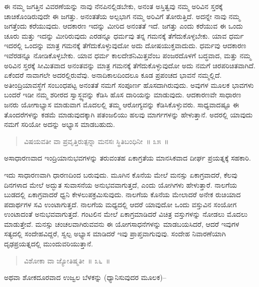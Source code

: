 ಈ ನಮ್ಮ ಜಗತ್ತಿನ ವಿವರಣೆಯನ್ನು ನಾವು ನೆನಪಿನಲ್ಲಿಡಬೇಕು, ಅನಂತ ಅಸ್ತಿತ್ವವು ನಮ್ಮ ಅರಿವಿನ ಸ್ತರಕ್ಕೆ ಚಾಚಿಕೊಂಡಿರುವುದೇ ಈ ಜಗತ್ತು. ಅನಂತತೆಯ ಅಲ್ಪಭಾಗ ನಮ್ಮ ಅರಿವಿಗೆ ತೋರುತ್ತಿದೆ. ಅದನ್ನೇ ನಾವು ನಮ್ಮ ಜಗತ್ತೆಂದು ಕರೆಯುವುದು. ಆದಕಾರಣ ಇದನ್ನು ಮೀರಿದ ಅನಂತತೆ ಇದೆ. ಜಗತ್ತು ಎಂದು ಕರೆಯುವ ಈ ಒಂದು ಚೂರು ಮತ್ತು ಇದನ್ನು ಮೀರಿರುವುದು ಎರಡನ್ನೂ ಧರ್ಮವು ತನ್ನ ಗಮನಕ್ಕೆ ತೆಗೆದುಕೊಳ್ಳಬೇಕು. ಯಾವ ಧರ್ಮ ಇದರಲ್ಲಿ ಒಂದನ್ನು ಮಾತ್ರ ಗಮನಕ್ಕೆ ತೆಗೆದುಕೊಳ್ಳುವುದೋ ಅದು ದೋಷಯುಕ್ತವಾದುದು. ಧರ್ಮವು ಆದಕಾರಣ ಇವೆರಡನ್ನೂ ನೋಡಿಕೊಳ್ಳಬೇಕು. ಯಾವ ಧರ್ಮ ಕಾಲದೇಶನಿಮಿತ್ತವೆಂಬ ಪಂಜರದೊಳಗೆ ಬದ್ಧವಾದ, ಮತ್ತು ನಮ್ಮ ಅರಿವಿನ ಸ್ತರಕ್ಕೆ ಸೀಮಿತವಾದ ಅನಂತವನ್ನು ಮಾತ್ರ ಗಮನಕ್ಕೆ ತೆಗೆದುಕೊಳ್ಳುವುದೋ ಅದು ನಮಗೆ ಚಿರಪರಿಚಿತವಾಗಿದೆ. ಏಕೆಂದರೆ ನಾವಾಗಲೇ ಅದರಲ್ಲಿರುವೆವು. ಅನಾದಿಕಾಲದಿಂದಲೂ ಕೂಡ ಪ್ರಪಂಚದ ಭಾವನೆ ನಮ್ಮಲ್ಲಿದೆ. ಅತೀಂದ್ರಿಯಾವಸ್ಥೆಗೆ ಸಂಬಂಧಪಟ್ಟ ಅನಂತತೆ ನಮಗೆ ಸಂಪೂರ್ಣ ಹೊಸದಾಗಿರುವುದು. ಅವುಗಳ ಮೂಲಕ ಭಾವಗಳು ಬಂದರೆ ಇಡೀ ನಮ್ಮ ಶರೀರದ ಸ್ವಾಸ್ಥ್ಯವನ್ನು ಕೆಡಿಸಿ ಹೊಸ ದಾರಿಯನ್ನು ಮಾಡುವುದು. ಆದಕಾರಣವೇ ಸಾಧಾರಣ ಜನರು ಯೋಗಾಭ್ಯಾಸ ಮಾಡುವಾಗ ಮೊದಲಲ್ಲಿ ತಮ್ಮ ಆರೋಗ್ಯವನ್ನು ಕೆಡಿಸಿಕೊಳ್ಳುವರು. ಸಾಧ್ಯವಾದಷ್ಟೂ ಈ ತೊಂದರೆಗಳನ್ನು ಕಡಮೆ ಮಾಡುವುದಕ್ಕಾಗಿ ಪತಂಜಲಿಯು ಹಲವು ಮಾರ್ಗಗಳನ್ನು ಹೇಳುತ್ತಾನೆ. ಅದರಲ್ಲಿ ಯಾವುದು ನಮಗೆ ಸರಿಯೋ ಅದನ್ನು ಅಭ್ಯಾಸ ಮಾಡಬಹುದು. 


\begin{verse}
ವಿಷಯವತೀ ವಾ ಪ್ರವೃತ್ತಿರುತ್ಪನ್ನಾ ಮನಸಃ ಸ್ಥಿತಿಬಂಧಿನೀ~॥ ೩೫~॥
\end{verse}

\vspace{-0.28cm}

ಅಸಾಧಾರಣವಾದ ಇಂದ್ರಿಯಾನುಭವಗಳನ್ನು ತರುವಂತಹ ಏಕಾಗ್ರತೆಯ ಮಾನಸಿಕವಾದ ದೀರ್ಘ ಪ್ರಯತ್ನಕ್ಕೆ ಸಹಕಾರಿ. 

ಇದು ಸಾಧಾರಣವಾಗಿ ಧಾರಣದಿಂದ ಬರುವುದು. ಮೂಗಿನ ಕೊನೆಯ ಮೇಲೆ ಮನಸ್ಸು ಏಕಾಗ್ರವಾದರೆ, ಕೆಲವು ದಿನಗಳಾದ ಮೇಲೆ ಅದ್ಭುತ ಸುವಾಸನೆಯ ಅನುಭವವಾಗುತ್ತದೆ, ಎಂದು ಯೋಗಿಗಳು ಹೇಳುತ್ತಾರೆ. ನಾಲಗೆಯ ಬುಡದಲ್ಲಿ ಏಕಾಗ್ರವಾದರೆ ಧ್ವನಿ ಕೇಳಲುಪಕ್ರಮಿಸುವುದು. ನಾಲಗೆಯ ಕೊನೆಯ ಮೇಲಾದರೆ ಅನೇಕ ರುಚಿಯಾದ ಪದಾರ್ಥಗಳ ಸವಿ ಉಂಟಾಗುತ್ತದೆ. ನಾಲಗೆಯ ಮಧ್ಯದಲ್ಲಿ ಆದರೆ ಯಾವುದೋ ಒಂದು ವಸ್ತುವಿನ ಸಂಯೋಗ ಉಂಟಾದಂತೆ ಅನುಭವವಾಗುತ್ತದೆ. ಗಂಟಲಿನ ಮೇಲೆ ಏಕಾಗ್ರಮಾಡಿದರೆ ವಿಚಿತ್ರ ವಸ್ತುಗಳನ್ನು ನೋಡಲು ಮೊದಲು ಮಾಡುತ್ತೇವೆ. ಮನಸ್ಸು ಚಂಚಲವಾಗಿರುವವನು ಈ ಯೋಗಸಾಧನೆಗಳನ್ನು ಮಾಡಬಯಸಿದರೆ, ಆದರೆ ಇವುಗಳ ಸತ್ಯದಲ್ಲಿ ಸಂದೇಹವಿದ್ದರೆ, ಸ್ವಲ್ಪ ಅಭ್ಯಾಸ ಮಾಡಿದರೆ ಇವು ಪ್ರಾಪ್ತವಾಗುವುವು. ಸಂದೇಹ ನಿವಾರಣೆಯಾಗಿ ದೃಢಪ್ರಯತ್ನದಲ್ಲಿ ಮುಂದುವರಿಯುತ್ತಾನೆ. 

\vspace{-0.25cm}

\begin{verse}
ವಿಶೋಕಾ ವಾ ಜ್ಯೋತಿಷ್ಮತೀ~॥ ೩೬~॥
\end{verse}

\vspace{-0.3cm}

ಅಥವಾ ಶೋಕದೂರವಾದ ಉಜ್ವಲ ಬೆಳಕನ್ನು (ಧ್ಯಾನಿಸುವುದರ ಮೂಲಕ)–

